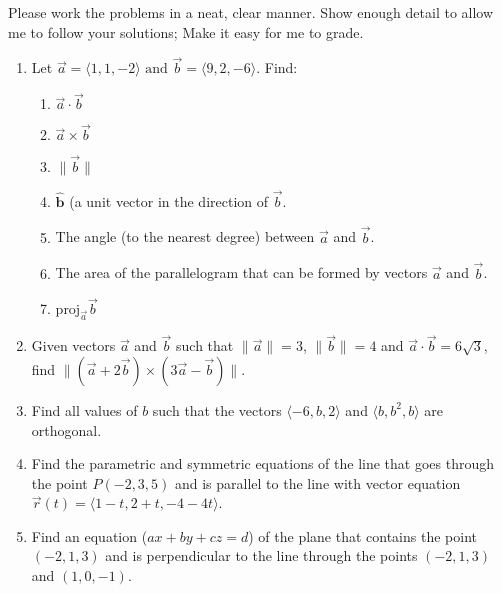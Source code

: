 \documentclass[12pt,letterpaper,fleqn]{article}
\let\oldhat\hat
\renewcommand{\hat}[1]{\oldhat{\boldsymbol{\mathbf{#1}}}}
\newcommand{\lv}[1]{\ensuremath{\langle #1 \rangle}}
\begin{document}
Please work the problems in a neat, clear manner. Show enough detail to
allow me to follow your solutions; Make it easy for me to grade.
\begin{enumerate}
 \item Let $\vec{a} = \lv{1, 1, -2} \text{ and } \vec{b} = \lv{9, 2 , -6}$.
       Find:
       \begin{enumerate}
        \item $\vec{a}\cdot\vec{b}$
        \item $\vec{a}\times\vec{b}$
        \item $\|\vec{b}\|$
        \item $\hat{b}$ (a unit vector in the direction of $\vec{b}$.
        \item The angle (to the nearest degree) between $\vec{a}$ and $\vec{b}$.
        \item The area of the parallelogram that can be formed by vectors $\vec{a}$ and $\vec{b}$.
        \item $\text{proj}_{\vec{a}} \vec{b}$
       \end{enumerate}
 \item Given vectors $\vec{a}$ and $\vec{b}$ such that $\|\vec{a}\| = 3$, $\|\vec{b}\| = 4$ and $\vec{a}\cdot\vec{b} = 6\sqrt{3}$, find $\|(\vec{a} + 2\vec{b})\times (3\vec{a} - \vec{b})\|$.
 \item Find all values of $b$ such that the vectors $\lv{-6,b,2}$ and
       $\lv{b,b^2,b}$ are orthogonal.
 \item Find the parametric and symmetric equations of the line that goes through the point $P(-2,3,5)$ and is parallel to the line with vector equation $\vec{r}(t)=\lv{1-t, 2+t, -4-4t}$.
 \item Find an equation ($ax + by + cz = d$) of the plane that contains the point $(-2,1,3)$ and is perpendicular to the line through the points $(-2,1,3)$ and $(1,0,-1)$.

\end{enumerate}
\end{document}
